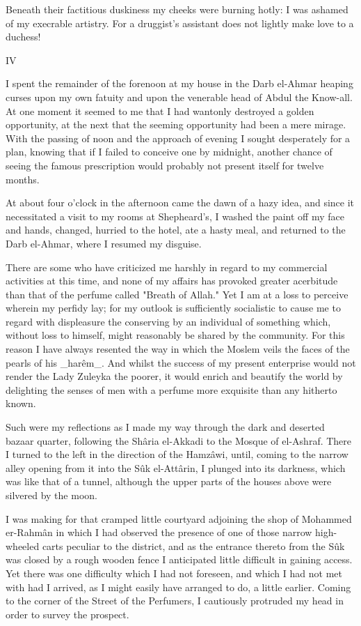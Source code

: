 Beneath their factitious duskiness my cheeks were burning hotly: I was
ashamed of my execrable artistry. For a druggist's assistant does not
lightly make love to a duchess!


IV

I spent the remainder of the forenoon at my house in the Darb el-Ahmar
heaping curses upon my own fatuity and upon the venerable head of
Abdul the Know-all. At one moment it seemed to me that I had wantonly
destroyed a golden opportunity, at the next that the seeming
opportunity had been a mere mirage. With the passing of noon and the
approach of evening I sought desperately for a plan, knowing that if
I failed to conceive one by midnight, another chance of seeing the
famous prescription would probably not present itself for twelve
months.

At about four o'clock in the afternoon came the dawn of a hazy idea,
and since it necessitated a visit to my rooms at Shepheard's, I washed
the paint off my face and hands, changed, hurried to the hotel, ate a
hasty meal, and returned to the Darb el-Ahmar, where I resumed my
disguise.

There are some who have criticized me harshly in regard to my
commercial activities at this time, and none of my affairs has
provoked greater acerbitude than that of the perfume called "Breath
of Allah." Yet I am at a loss to perceive wherein my perfidy lay; for
my outlook is sufficiently socialistic to cause me to regard with
displeasure the conserving by an individual of something which,
without loss to himself, might reasonably be shared by the community.
For this reason I have always resented the way in which the Moslem
veils the faces of the pearls of his _harêm_. And whilst the success
of my present enterprise would not render the Lady Zuleyka the poorer,
it would enrich and beautify the world by delighting the senses of men
with a perfume more exquisite than any hitherto known.

Such were my reflections as I made my way through the dark and
deserted bazaar quarter, following the Shâria el-Akkadi to the Mosque
of el-Ashraf. There I turned to the left in the direction of the
Hamzâwi, until, coming to the narrow alley opening from it into the
Sûk el-Attârin, I plunged into its darkness, which was like that of
a tunnel, although the upper parts of the houses above were silvered
by the moon.

I was making for that cramped little courtyard adjoining the shop of
Mohammed er-Rahmân in which I had observed the presence of one of
those narrow high-wheeled carts peculiar to the district, and as the
entrance thereto from the Sûk was closed by a rough wooden fence I
anticipated little difficult in gaining access. Yet there was one
difficulty which I had not foreseen, and which I had not met with had
I arrived, as I might easily have arranged to do, a little earlier.
Coming to the corner of the Street of the Perfumers, I cautiously
protruded my head in order to survey the prospect.

